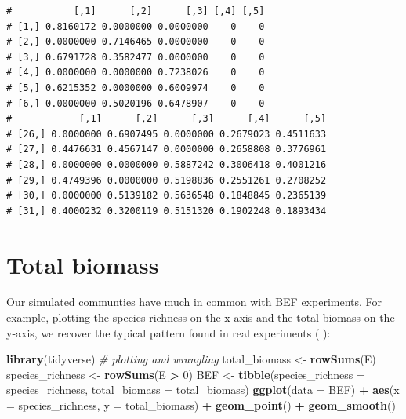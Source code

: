 \documentclass[]{book}
\newenvironment{Shaded}{\begin{snugshade}}{\end{snugshade}}
\newcommand{\CommentTok}[1]{\textcolor[rgb]{0.56,0.35,0.01}{\textit{#1}}}
\newcommand{\DataTypeTok}[1]{\textcolor[rgb]{0.13,0.29,0.53}{#1}}
\newcommand{\DecValTok}[1]{\textcolor[rgb]{0.00,0.00,0.81}{#1}}
\newcommand{\KeywordTok}[1]{\textcolor[rgb]{0.13,0.29,0.53}{\textbf{#1}}}
\newcommand{\NormalTok}[1]{#1}
\newcommand{\OperatorTok}[1]{\textcolor[rgb]{0.81,0.36,0.00}{\textbf{#1}}}
\newcommand{\StringTok}[1]{\textcolor[rgb]{0.31,0.60,0.02}{#1}}
\begin{document}
\begin{verbatim}
#           [,1]      [,2]      [,3] [,4] [,5]
# [1,] 0.8160172 0.0000000 0.0000000    0    0
# [2,] 0.0000000 0.7146465 0.0000000    0    0
# [3,] 0.6791728 0.3582477 0.0000000    0    0
# [4,] 0.0000000 0.0000000 0.7238026    0    0
# [5,] 0.6215352 0.0000000 0.6009974    0    0
# [6,] 0.0000000 0.5020196 0.6478907    0    0
#            [,1]      [,2]      [,3]      [,4]      [,5]
# [26,] 0.0000000 0.6907495 0.0000000 0.2679023 0.4511633
# [27,] 0.4476631 0.4567147 0.0000000 0.2658808 0.3776961
# [28,] 0.0000000 0.0000000 0.5887242 0.3006418 0.4001216
# [29,] 0.4749396 0.0000000 0.5198836 0.2551261 0.2708252
# [30,] 0.0000000 0.5139182 0.5636548 0.1848845 0.2365139
# [31,] 0.4000232 0.3200119 0.5151320 0.1902248 0.1893434
\end{verbatim}

\hypertarget{total-biomass}{%
\section{Total biomass}\label{total-biomass}}

Our simulated communties have much in common with BEF experiments. For example, plotting the species richness on the x-axis and the total biomass on the y-axis, we recover the typical pattern found in real experiments (\citep{hector1999plant} \citep{tilman2001diversity} \citep{cadotte2013experimental}):

\begin{Shaded}
\begin{Highlighting}[]
\KeywordTok{library}\NormalTok{(tidyverse) }\CommentTok{# plotting and wrangling}
\NormalTok{total_biomass <-}\StringTok{ }\KeywordTok{rowSums}\NormalTok{(E)}
\NormalTok{species_richness <-}\StringTok{ }\KeywordTok{rowSums}\NormalTok{(E }\OperatorTok{>}\StringTok{ }\DecValTok{0}\NormalTok{)}
\NormalTok{BEF <-}\StringTok{ }\KeywordTok{tibble}\NormalTok{(}\DataTypeTok{species_richness =}\NormalTok{ species_richness, }\DataTypeTok{total_biomass =}\NormalTok{ total_biomass)}
\KeywordTok{ggplot}\NormalTok{(}\DataTypeTok{data =}\NormalTok{ BEF) }\OperatorTok{+}\StringTok{ }
\StringTok{  }\KeywordTok{aes}\NormalTok{(}\DataTypeTok{x =}\NormalTok{ species_richness, }\DataTypeTok{y =}\NormalTok{ total_biomass) }\OperatorTok{+}\StringTok{ }
\StringTok{  }\KeywordTok{geom_point}\NormalTok{() }\OperatorTok{+}\StringTok{ }\KeywordTok{geom_smooth}\NormalTok{()}
\end{Highlighting}
\end{Shaded}
\end{document}
